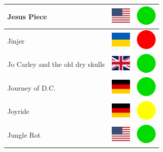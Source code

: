 \documentclass[12pt, a4paper, twoside]{report}
\begin{document}
\begin{center}
\begin{longtable}{|p{5cm}|p{2cm}|p{2cm}|}
 Jesus Piece                                                & \includegraphics[width=1cm]{../img/flags/us} &   \includegraphics[width=1cm]{../likes/y} \\ \hline
 Jinjer                                                     & \includegraphics[width=1cm]{../img/flags/ua} &   \includegraphics[width=1cm]{../likes/n} \\ \hline
 Jo Carley and the old dry skulls                           & \includegraphics[width=1cm]{../img/flags/gb} &   \includegraphics[width=1cm]{../likes/y} \\ \hline
 Journey of D.C.                                            & \includegraphics[width=1cm]{../img/flags/de} &   \includegraphics[width=1cm]{../likes/y} \\ \hline
 Joyride                                                    & \includegraphics[width=1cm]{../img/flags/de} &   \includegraphics[width=1cm]{../likes/m} \\ \hline
 Jungle Rot                                                 & \includegraphics[width=1cm]{../img/flags/us} &   \includegraphics[width=1cm]{../likes/y} \\ \hline

\end{longtable}
\end{center}
\end{document}

